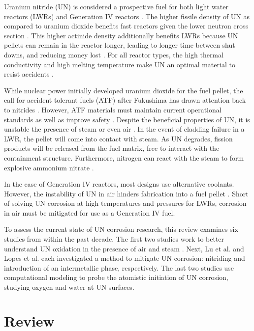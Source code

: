 \documentclass[11pt]{article}
\begin{document}
Uranium nitride (UN) is considered a prospective fuel for both light water reactors (LWRs) and Generation IV reactors \cite{Streit2005,Mizutani1998}. The higher fissile density of UN as compared to uranium dioxide benefits fast reactors given the lower neutron cross section \cite{Silva2009}. This higher actinide density additionally benefits LWRs because UN pellets can remain in the reactor longer, leading to longer time between shut downs, and reducing money lost \cite{Lopes2017}. For all reactor types, the high thermal conductivity and high melting temperature make UN an optimal material to resist accidents \cite{Lopes2017}.
\par 
While nuclear power initially developed uranium dioxide for the fuel pellet, the call for accident tolerant fuels (ATF) after Fukushima has drawn attention back to nitrides \cite{Johnson2016}. However, ATF materials must maintain current operational standards as well as improve safety \cite{Zinkle2014}. Despite the beneficial properties of UN, it is unstable the presence of steam or even air \cite{Johnson2016,Jolkkonen2017,Lopes2017}. In the event of cladding failure in a LWR, the pellet will come into contact with steam. As UN degrades, fission products will be released from the fuel matrix, free to interact with the containment structure. Furthermore, nitrogen can react with the steam to form explosive ammonium nitrate \cite{Jolkkonen2017}.
\par 
 In the case of Generation IV reactors, most designs use alternative coolants. However, the instability of UN in air hinders fabrication into a fuel pellet \cite{Lopes2017}. Short of solving UN corrosion at high temperatures and pressures for LWRs, corrosion in air must be mitigated for use as a Generation IV fuel.
 \par 
 To assess the current state of UN corrosion research, this review examines six studies from within the past decade. The first two studies work to better understand UN oxidation in the presence of air \cite{Johnson2016} and steam \cite{Jolkkonen2017}. Next, Lu et al. \cite{Lu2016} and Lopes et al. \cite{Lopes2017} each investigated a method to mitigate UN corrosion: nitriding and introduction of an intermetallic phase, respectively. The last two studies use computational modeling to probe the atomistic initiation of UN corrosion, studying oxygen \cite{Bocharov2013} and water \cite{Bo2016} at UN surfaces.

\section{Review}
\end{document}
